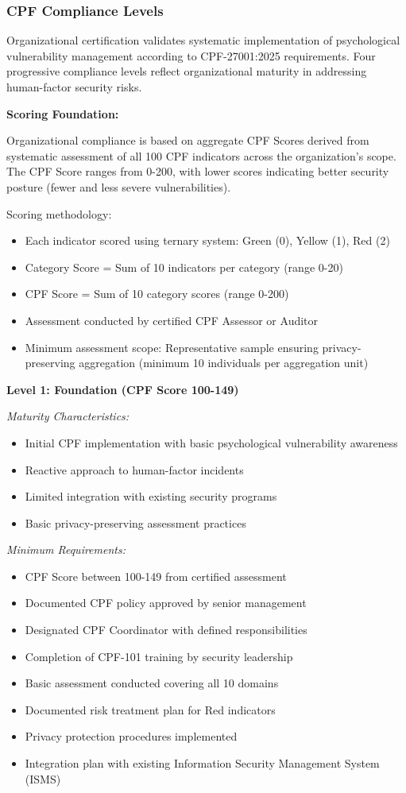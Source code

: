 \documentclass[11pt,a4paper]{article}
\begin{document}
\subsubsection{CPF Compliance Levels}

Organizational certification validates systematic implementation of psychological vulnerability management according to CPF-27001:2025 requirements. Four progressive compliance levels reflect organizational maturity in addressing human-factor security risks.

\textbf{Scoring Foundation:}

Organizational compliance is based on aggregate CPF Scores derived from systematic assessment of all 100 CPF indicators across the organization's scope. The CPF Score ranges from 0-200, with lower scores indicating better security posture (fewer and less severe vulnerabilities).

Scoring methodology:
\begin{itemize}
\item Each indicator scored using ternary system: Green (0), Yellow (1), Red (2)
\item Category Score = Sum of 10 indicators per category (range 0-20)
\item CPF Score = Sum of 10 category scores (range 0-200)
\item Assessment conducted by certified CPF Assessor or Auditor
\item Minimum assessment scope: Representative sample ensuring privacy-preserving aggregation (minimum 10 individuals per aggregation unit)
\end{itemize}

\textbf{Level 1: Foundation (CPF Score 100-149)}

\textit{Maturity Characteristics:}
\begin{itemize}
\item Initial CPF implementation with basic psychological vulnerability awareness
\item Reactive approach to human-factor incidents
\item Limited integration with existing security programs
\item Basic privacy-preserving assessment practices
\end{itemize}

\textit{Minimum Requirements:}
\begin{itemize}
\item CPF Score between 100-149 from certified assessment
\item Documented CPF policy approved by senior management
\item Designated CPF Coordinator with defined responsibilities
\item Completion of CPF-101 training by security leadership
\item Basic assessment conducted covering all 10 domains
\item Documented risk treatment plan for Red indicators
\item Privacy protection procedures implemented
\item Integration plan with existing Information Security Management System (ISMS)
\end{itemize}
\end{document}
